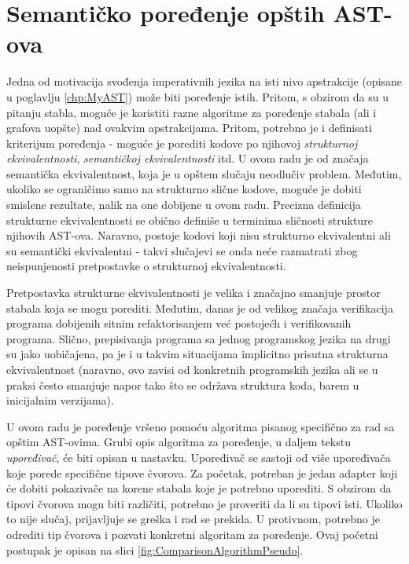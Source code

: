 \chapter{Semantičko poređenje opštih AST-ova}
\label{chp:ASTComparing}

Jedna od motivacija svođenja imperativnih jezika na isti nivo apstrakcije (opisane u poglavlju \ref{chp:MyAST}) može biti poređenje istih. Pritom, s obzirom da su u pitanju stabla, moguće je koristiti razne algoritme za poređenje stabala (ali i grafova uopšte) nad ovakvim apstrakcijama. Pritom, potrebno je i definisati kriterijum poređenja - moguće je porediti kodove po njihovoj \emph{strukturnoj ekvivalentnosti}, \emph{semantičkoj ekvivalentnosti} itd. U ovom radu je od značaja semantička ekvivalentnost, koja je u opštem slučaju neodlučiv problem. Međutim, ukoliko se ograničimo samo na strukturno slične kodove, moguće je dobiti smislene rezultate, nalik na one dobijene u ovom radu. Precizna definicija strukturne ekvivalentnosti se obično definiše u terminima sličnosti strukture njihovih AST-ova. Naravno, postoje kodovi koji nisu strukturno ekvivalentni ali su semantički ekvivalentni - takvi slučajevi se onda neće razmatrati zbog neispunjenosti pretpostavke o strukturnoj ekvivalentnosti. 

Pretpostavka strukturne ekvivalentnosti je velika i značajno smanjuje prostor stabala koja se mogu porediti. Međutim, danas je od velikog značaja verifikacija programa dobijenih sitnim refaktorisanjem već postojećh i verifikovanih programa. Slično, prepisivanja programa sa jednog programskog jezika na drugi su jako uobičajena, pa je i u takvim situacijama implicitno prisutna strukturna ekvivalentnost (naravno, ovo zavisi od konkretnih programskih jezika ali se u praksi često smanjuje napor tako što se održava struktura koda, barem u inicijalnim verzijama). 

U ovom radu je poređenje vršeno pomoću algoritma pisanog specifično za rad sa opštim AST-ovima. Grubi opis algoritma za poređenje, u daljem tekstu \emph{upoređivač}, će biti opisan u nastavku.
Upoređivač se sastoji od više upoređivača koje porede specifične tipove čvorova. Za početak, potreban je jedan adapter koji će dobiti pokazivače na korene stabala koje je potrebno uporediti. S obzirom da tipovi čvorova mogu biti različiti, potrebno je proveriti da li su tipovi isti. Ukoliko to nije slučaj, prijavljuje se greška i rad se prekida. U protivnom, potrebno je odrediti tip čvorova i pozvati konkretni algoritam za poređenje. Ovaj početni postupak je opisan na slici \ref{fig:ComparisonAlgorithmPseudo}.

